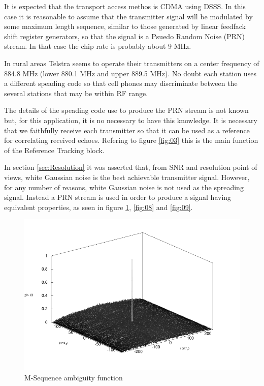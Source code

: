 \documentclass[a4paper]{report}
\numberwithin{equation}{chapter}
\begin{document}
It is expected that the transport access methos is CDMA using DSSS. In this case it is reasonable to assume that the transmitter signal will be modulated by some maximum length sequence, similar to those generated by linear feedfack shift register generators, so that the signal is a Psuedo Random Noise (PRN) stream. In that case the chip rate is probably about 9 MHz.

\bigskip

In rural areas Telstra seems to operate their transmitters on a center frequency of 884.8 MHz (lower 880.1 MHz and upper 889.5 MHz). No doubt each station uses a different speading code so that cell phones may discriminate between the several stations that may be within RF range.

\bigskip

The details of the speading code use to produce the PRN stream is not known but, for this application, it is no necessary to have this knowledge. It is necessary that we faithfully receive each transmitter so that it can be used as a reference for correlating received echoes. Refering to figure \ref{fig:03} this is the main function of the Reference Tracking block.

\bigskip

In section \ref{sec:Resolution} it was asserted that, from SNR and resolution point of views, white Gaussian noise is the best achievable transmitter signal. However, for any number of reasons, white Gaussian noise is not used as the spreading signal. Instead a PRN stream is used in order to produce a signal having equivalent properties, as seen in figure \ref{fig:13}, \ref{fig:08} and \ref{fig:09}.

\begin{figure}
\centering 
\includegraphics{Passive-Weather-Radar-Theory-fig-13.pdf}
\caption[M-Sequence ambiguity function]{M-Sequence ambiguity function}
\label{fig:13}
\end{figure}
\end{document}
